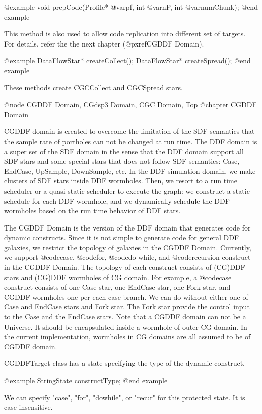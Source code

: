 {@example
void prepCode(Profile* @var{pf}, int @var{nP}, int @var{numChunk});
@end example

This method is also used to allow code replication into different set of
targets. For details, refer the the next chapter (@pxref{CGDDF Domain}).

@example
DataFlowStar* createCollect();
DataFlowStar* createSpread();
@end example

These methods create CGCCollect and CGCSpread stars.

@node CGDDF Domain, CGdsp3 Domain, CGC Domain, Top
@chapter CGDDF Domain

CGDDF domain is created to overcome the limitation of the SDF semantics
that the sample rate of portholes can not be changed at run time. The
DDF domain is a super set of the SDF domain in the sense that the DDF
domain support all SDF stars and some special stars that does not
follow SDF semantics: Case, EndCase, UpSample, DownSample, etc. In the
DDF simulation domain, we make clusters of SDF stars inside DDF wormholes.
Then, we resort to a run time scheduler or a quasi-static scheduler to
execute the graph: we construct a static schedule for each DDF wormhole,
and we dynamically schedule the DDF wormholes based on the run time behavior
of DDF stars.

The CGDDF Domain is the version of the DDF domain that generates code 
for dynamic constructs. Since it is not simple to generate code for 
general DDF galaxies,
we restrict the topology of galaxies in the CGDDF Domain. Currently,
we support @code{case}, @code{for}, @code{do-while}, and @code{recursion}
construct in the CGDDF Domain. The topology of each construct consists of
(CG)DDF stars and (CG)DDF wormholes of CG domain. For example,
a @code{case} construct consists of one Case star, one EndCase star,
one Fork star, and CGDDF wormholes one per each case branch. We can do
without either one of Case and EndCase stars and Fork star. The Fork star
provide the control input to the Case and the EndCase stars. Note that
a CGDDF domain can not be a Universe. It should be encapsulated inside
a wormhole of outer CG domain. In the current implementation, wormholes in
CG domains are all assumed to be of CGDDF domain.

CGDDFTarget class has a state specifying the type of the dynamic construct.

@example
StringState constructType;
@end example

We can specify "case", "for", "dowhile", or "recur" for this protected state.
It is case-insensitive.

}
